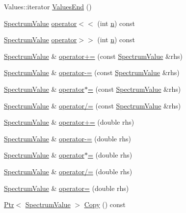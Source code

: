\begin{DoxyCompactItemize}
\item 
Values\+::iterator \hyperlink{classns3_1_1SpectrumValue_aa0e76e888fc6cba3b01bf638b6c4567f}{Values\+End} ()
\item 
\hyperlink{classns3_1_1SpectrumValue}{Spectrum\+Value} \hyperlink{classns3_1_1SpectrumValue_aac15fe8980c0b24aa495a30b8323212b}{operator$<$$<$} (int \hyperlink{lte__link__budget__x2__handover__measures_8m_abdb05bc5a064cf642a06c83b3392f148}{n}) const 
\item 
\hyperlink{classns3_1_1SpectrumValue}{Spectrum\+Value} \hyperlink{classns3_1_1SpectrumValue_a2f3ab85f3724ba76119a2cc0ac39a0cb}{operator$>$$>$} (int \hyperlink{lte__link__budget__x2__handover__measures_8m_abdb05bc5a064cf642a06c83b3392f148}{n}) const 
\item 
\hyperlink{classns3_1_1SpectrumValue}{Spectrum\+Value} \& \hyperlink{classns3_1_1SpectrumValue_af29959e007903c4a30ead65ec02dded9}{operator+=} (const \hyperlink{classns3_1_1SpectrumValue}{Spectrum\+Value} \&rhs)
\item 
\hyperlink{classns3_1_1SpectrumValue}{Spectrum\+Value} \& \hyperlink{classns3_1_1SpectrumValue_af6b4d8fade599d79aed9c4d16b0613d8}{operator-\/=} (const \hyperlink{classns3_1_1SpectrumValue}{Spectrum\+Value} \&rhs)
\item 
\hyperlink{classns3_1_1SpectrumValue}{Spectrum\+Value} \& \hyperlink{classns3_1_1SpectrumValue_ab7ad25a1b095cc05997de52b2768b1bf}{operator$\ast$=} (const \hyperlink{classns3_1_1SpectrumValue}{Spectrum\+Value} \&rhs)
\item 
\hyperlink{classns3_1_1SpectrumValue}{Spectrum\+Value} \& \hyperlink{classns3_1_1SpectrumValue_af1593e3c9fe69492a9ef03ddfec5f440}{operator/=} (const \hyperlink{classns3_1_1SpectrumValue}{Spectrum\+Value} \&rhs)
\item 
\hyperlink{classns3_1_1SpectrumValue}{Spectrum\+Value} \& \hyperlink{classns3_1_1SpectrumValue_a5411528d7f711782f4ddddf18945b753}{operator+=} (double rhs)
\item 
\hyperlink{classns3_1_1SpectrumValue}{Spectrum\+Value} \& \hyperlink{classns3_1_1SpectrumValue_a57e4c5906ced4c2d0c8c0f92c9671ad0}{operator-\/=} (double rhs)
\item 
\hyperlink{classns3_1_1SpectrumValue}{Spectrum\+Value} \& \hyperlink{classns3_1_1SpectrumValue_a41fc35930312dc34c1e2e59e65113032}{operator$\ast$=} (double rhs)
\item 
\hyperlink{classns3_1_1SpectrumValue}{Spectrum\+Value} \& \hyperlink{classns3_1_1SpectrumValue_ab6b13f341387642951f952ffc561fc8f}{operator/=} (double rhs)
\item 
\hyperlink{classns3_1_1SpectrumValue}{Spectrum\+Value} \& \hyperlink{classns3_1_1SpectrumValue_a372359d67669ebd3d16535a343f0c745}{operator=} (double rhs)
\item 
\hyperlink{classns3_1_1Ptr}{Ptr}$<$ \hyperlink{classns3_1_1SpectrumValue}{Spectrum\+Value} $>$ \hyperlink{classns3_1_1SpectrumValue_a2b5dc6d7a862e9036b2edd01cadaec69}{Copy} () const 
\end{DoxyCompactItemize}
